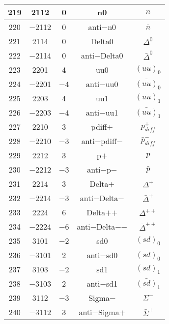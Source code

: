 \documentclass{article}
\begin{document}
\begin{table}[!htbp]
\begin{tabular}{|c|c|c|c|c|}
\hline
219 & 2112 & 0 & n0 & $n$ \\
\hline
220 & $-$2112 & 0 & anti$-$n0 & $\bar{n}$ \\
\hline
221 & 2114 & 0 & Delta0 & $\Delta^{0}$ \\
\hline
222 & $-$2114 & 0 & anti$-$Delta0 & $\bar{\Delta}^{0}$ \\
\hline
223 & 2201 & 4 & uu\underline{\hspace{0.6em}}0 & $(uu)_{0}$ \\
\hline
224 & $-$2201 & $-$4 & anti$-$uu\underline{\hspace{0.6em}}0 & $\bar{(uu)}_{0}$ \\
\hline
225 & 2203 & 4 & uu\underline{\hspace{0.6em}}1 & $(uu)_{1}$ \\
\hline
226 & $-$2203 & $-$4 & anti$-$uu\underline{\hspace{0.6em}}1 & $\bar{(uu)}_{1}$ \\
\hline
227 & 2210 & 3 & p\underline{\hspace{0.6em}}diff$+$ & $p_{diff}^{+}$ \\
\hline
228 & $-$2210 & $-$3 & anti$-$p\underline{\hspace{0.6em}}diff$-$ & $\bar{p}_{diff}^{-}$ \\
\hline
229 & 2212 & 3 & p$+$ & $p$ \\
\hline
230 & $-$2212 & $-$3 & anti$-$p$-$ & $\bar{p}$ \\
\hline
231 & 2214 & 3 & Delta$+$ & $\Delta^{+}$ \\
\hline
232 & $-$2214 & $-$3 & anti$-$Delta$-$ & $\bar{\Delta}^{+}$ \\
\hline
233 & 2224 & 6 & Delta$+$$+$ & $\Delta^{++}$ \\
\hline
234 & $-$2224 & $-$6 & anti$-$Delta$-$$-$ & $\bar{\Delta}^{++}$ \\
\hline
235 & 3101 & $-$2 & sd\underline{\hspace{0.6em}}0 & $(sd)_{0}$ \\
\hline
236 & $-$3101 & 2 & anti$-$sd\underline{\hspace{0.6em}}0 & $\bar{(sd)}_{0}$ \\
\hline
237 & 3103 & $-$2 & sd\underline{\hspace{0.6em}}1 & $(sd)_{1}$ \\
\hline
238 & $-$3103 & 2 & anti$-$sd\underline{\hspace{0.6em}}1 & $\bar{(sd)}_{1}$ \\
\hline
239 & 3112 & $-$3 & Sigma$-$ & $\Sigma^{-}$ \\
\hline
240 & $-$3112 & 3 & anti$-$Sigma$+$ & $\bar{\Sigma}^{+}$ \\
\hline
\end{tabular}
\end{table}
\end{document}
